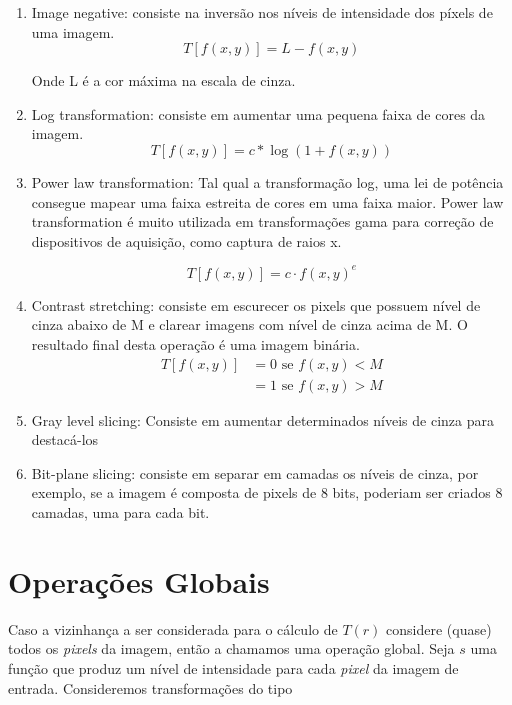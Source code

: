 \documentclass[10pt,a4paper]{article}
\newcommand{\pixel}{\textit{pixel} }
\newcommand{\pixels}{\textit{pixels} }
\begin{document}
\begin{enumerate}
    \item Image negative: consiste na inversão nos níveis de intensidade dos píxels de uma imagem.
        \[T[f(x,y)] = L - f(x,y)\]

        Onde L é a cor máxima na escala de cinza.

    \item Log transformation: consiste em aumentar uma pequena faixa de cores da imagem.
        \[T[f(x,y)] = c * \log(1 + f(x,y))\]

    \item Power law transformation: Tal qual a transformação log, uma lei de potência consegue mapear uma faixa estreita de cores em uma faixa maior. Power law transformation é muito utilizada em transformações gama para correção de dispositivos de aquisição, como captura de raios x.

        \[T[f(x,y)] = c \cdot f(x,y) ^e\]

    \item Contrast stretching: consiste em escurecer os pixels que possuem nível de cinza abaixo de M e clarear imagens com nível de cinza acima de M. O resultado final desta operação é uma imagem binária.
        \begin{align*}
            T[f(x,y)] &= 0 \text{ se } f(x,y) < M \\
                      &= 1 \text{ se } f(x,y) > M
        \end{align*}

    \item Gray level slicing: Consiste em aumentar determinados níveis de cinza para destacá-los

    \item Bit-plane slicing: consiste em separar em camadas os níveis de cinza, por exemplo, se a imagem é composta de pixels de 8 bits, poderiam ser criados 8 camadas, uma para cada bit.

\end{enumerate}

\section{Operações Globais}
Caso a vizinhança a ser considerada para o cálculo de $T(r)$ considere (quase) todos os \pixels da imagem, então a chamamos uma operação global. Seja $s$ uma função que produz um nível de intensidade para cada \pixel da imagem de entrada. Consideremos transformações do tipo
\end{document}
